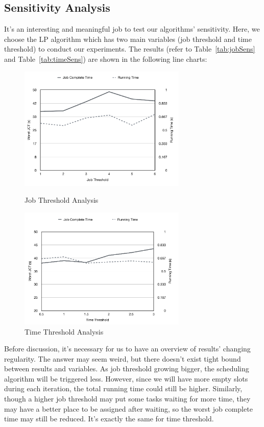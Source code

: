 \documentclass{llncs}
\begin{document}
\subsection{Sensitivity Analysis}
It's an interesting and meaningful job to test our algorithms' sensitivity. Here, we choose the LP algorithm which has two main variables (job threshold and time threshold) to conduct our experiments. The results (refer to Table~\ref{tab:jobSens} and Table~\ref{tab:timeSens}) are shown in the following line charts:
\begin{figure}[htbp]
\centering
\begin{minipage}[t]{0.49\textwidth}
\centering
\includegraphics[width=8cm]{Figures/jobThreshold.pdf}
\caption{Job Threshold Analysis}
\label{fig:jobThreshold}
\end{minipage}
\begin{minipage}[t]{0.49\textwidth}
\centering
\includegraphics[width=8cm]{Figures/timeThreshold.pdf}
\caption{Time Threshold Analysis}
\label{fig:timeThreshold}
\end{minipage}
\end{figure}

Before discussion, it's necessary for us to have an overview of results' changing regularity. The answer may seem weird, but there doesn't exist tight bound between results and variables. As job threshold growing bigger, the scheduling algorithm will be triggered less. However, since we will have more empty slots during each iteration, the total running time could still be higher. Similarly, though a higher job threshold may put some tasks waiting for more time, they may have a better place to be assigned after waiting, so the worst job complete time may still be reduced. It's exactly the same for time threshold.
\end{document}

